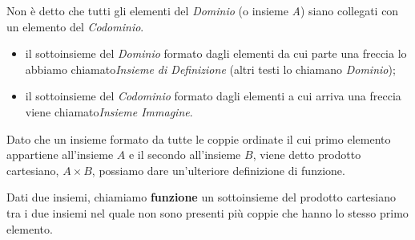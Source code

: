Non è detto che tutti gli elementi del \emph{Dominio} (o insieme \emph{A}) 
siano collegati con un elemento del \emph{Codominio}.
\begin{itemize}[nosep]
\item il sottoinsieme del \emph{Dominio} formato dagli elementi da cui parte 
una freccia lo abbiamo chiamato\emph{Insieme di Definizione} 
(altri testi lo chiamano \emph{Dominio});
\item il sottoinsieme del \emph{Codominio} formato dagli elementi a cui 
arriva una freccia viene chiamato\emph{Insieme Immagine}.
\end{itemize}

Dato che un insieme formato da tutte le coppie ordinate il cui primo elemento 
appartiene all'insieme \(A\) e il secondo all'insieme \(B\), viene detto 
prodotto cartesiano, \(A \times B\),
possiamo dare un'ulteriore definizione di funzione.

\begin{definizione}
Dati due insiemi, chiamiamo \textbf{funzione} 
un sottoinsieme del prodotto cartesiano tra i due insiemi nel quale non sono 
presenti più coppie che hanno lo stesso primo elemento.
\end{definizione}


